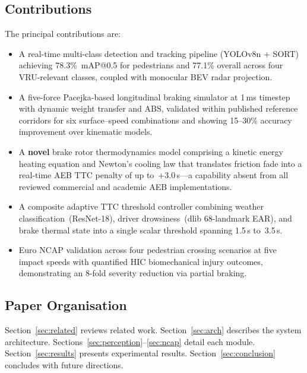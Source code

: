 \documentclass[journal]{IEEEtran}
\begin{document}
\subsection{Contributions}
The principal contributions are:
\begin{itemize}
  \item A real-time multi-class detection and tracking pipeline
        (YOLOv8n + SORT) achieving 78.3\%~mAP@0.5 for pedestrians and
        77.1\% overall across four VRU-relevant classes, coupled with
        monocular BEV radar projection.

  \item A five-force Pacejka-based longitudinal braking simulator at
        1\,ms timestep with dynamic weight transfer and ABS, validated
        within published reference corridors for six surface--speed
        combinations and showing 15--30\% accuracy improvement over
        kinematic models.

  \item A \textbf{novel} brake rotor thermodynamics model comprising a
        kinetic energy heating equation and Newton's cooling law that
        translates friction fade into a real-time AEB TTC penalty of up
        to~$+3.0$\,s---a capability absent from all reviewed commercial
        and academic AEB implementations.

  \item A composite adaptive TTC threshold controller combining weather
        classification~(ResNet-18), driver drowsiness~(dlib 68-landmark
        EAR), and brake thermal state into a single scalar threshold
        spanning 1.5\,s to~3.5\,s.

  \item Euro NCAP validation across four pedestrian crossing scenarios
        at five impact speeds with quantified HIC biomechanical injury
        outcomes, demonstrating an 8-fold severity reduction via partial
        braking.
\end{itemize}

\subsection{Paper Organisation}
Section~\ref{sec:related} reviews related work.
Section~\ref{sec:arch} describes the system architecture.
Sections~\ref{sec:perception}--\ref{sec:ncap} detail each module.
Section~\ref{sec:results} presents experimental results.
Section~\ref{sec:conclusion} concludes with future directions.
\end{document}
